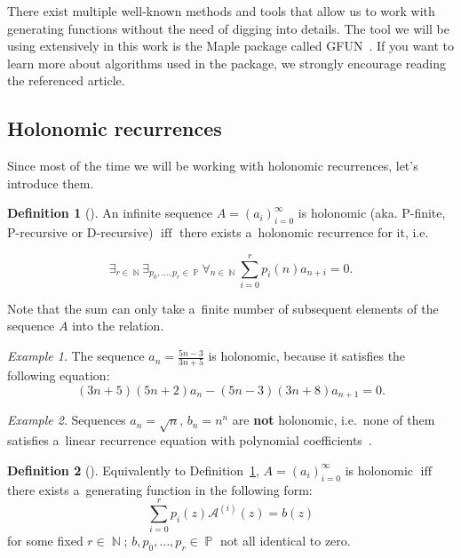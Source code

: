 \documentclass[final]{article}
\theoremstyle{definition}
\newtheorem{definition}{Definition}[subsection]
\theoremstyle{definition}
\theoremstyle{remark}
\newtheorem{example}{Example}[subsection]
\newcommand{\gf}[1]{\ensuremath{\mathcal{#1}}}
\DeclareMathOperator{\textiff}{\text{iff}}
\DeclareMathOperator{\N}{\mathbb{N}}
\DeclareMathOperator{\poly}{\mathbb{P}}
\begin{document}
There exist multiple well-known methods and tools that allow us to work with generating functions without the need of digging into details. The tool we will be using extensively in this work is the Maple package called GFUN~\cite{gfun}. If you want to learn more about algorithms used in the package, we strongly encourage reading the referenced article.

\subsection{Holonomic recurrences}%
\label{sub:holonomic_recurrences}

Since most of the time we will be working with holonomic recurrences, let's introduce them.

\begin{definition}[\cite{holotoolkit}]%
    \label{def:holo_1}
    An infinite sequence \(A = {(a_i)}_{i=0}^{\infty}\) is holonomic (aka. P-finite, P-recursive or D-recursive) \(\textiff\) there exists a~holonomic recurrence for it, i.e.

\[\exists_{r \in \N} \exists_{p_0, \ldots, p_r \in \poly} \forall_{n \in \N} \sum_{i=0}^r p_i(n)a_{n+i} = 0.\]
\end{definition}

Note that the sum can only take a~finite number of subsequent elements of the sequence \(A\) into the relation.

\begin{example}
    The sequence \(a_n = \frac{5n - 3}{3n + 5}\) is holonomic, because it satisfies the following equation:
    \[(3n + 5)(5n + 2) a_n - (5n - 3)(3n + 8) a_{n+1} = 0.\]
\end{example}

\begin{example}
    Sequences \(a_n = \sqrt{n}\), \(b_n = n^n\) are \textbf{not} holonomic, i.e.~none of them satisfies a~linear recurrence equation with polynomial coefficients~\cite{nonholo}.
\end{example}

\begin{definition}[\cite{complexity}]%
    \label{def:holo_2}
    Equivalently to Definition~\ref{def:holo_1}, \(A = {(a_i)}_{i=0}^{\infty}\) is holonomic \(\textiff\) there exists a~generating function in the following form:
    \[\sum_{i=0}^{r} p_i(z) \gf{A}^{(i)}(z) = b(z)\]
    for some fixed \(r \in \N\); \(b, p_0, \ldots, p_r \in \poly\) not all identical to zero.
\end{definition}
\end{document}
